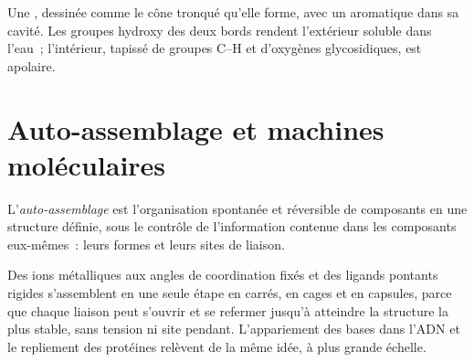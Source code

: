 \begin{omfigure}

{\small Une , dessinée comme le cône tronqué qu'elle forme,
avec un  aromatique dans sa cavité. Les groupes hydroxy des deux
bords rendent l'extérieur soluble dans l'eau~; l'intérieur, tapissé de
groupes C--H et d'oxygènes glycosidiques, est apolaire.}
\end{omfigure}

\section{Auto-assemblage et machines moléculaires}

\begin{definition}\label{def:b3:supramolecular:self-assembly}
L'\emph{auto-assemblage} est l'organisation
spontanée et réversible de composants en une structure définie, sous le
contrôle de l'information contenue dans les composants eux-mêmes~: leurs
formes et leurs sites de liaison.
\end{definition}

Des ions métalliques aux angles de coordination fixés et des ligands
pontants rigides s'assemblent en une seule étape en carrés, en cages et en
capsules, parce que chaque liaison peut s'ouvrir et se refermer jusqu'à
atteindre la structure la plus stable, sans tension ni site pendant.
L'appariement des bases dans l'ADN et le repliement des protéines relèvent
de la même idée, à plus grande échelle.

